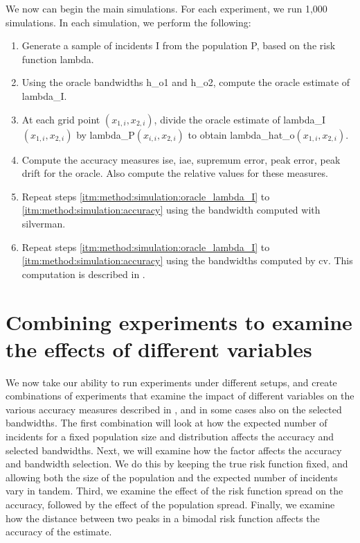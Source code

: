 We now can begin the main simulations.
For each experiment, we run 1,000 simulations.
In each simulation, we perform the following:
\begin{enumerate}
    \item\label{itm:method:simulation:generate} Generate a sample of incidents \gls{I} from the population \gls{P}, based on the risk function \gls{lambda}.
    \item\label{itm:method:simulation:oracle_lambda_I} Using the \gls{oracle} bandwidths \gls{h_o1} and \gls{h_o2}, compute the \gls{oracle} estimate of \gls{lambda_I}.
    \item\label{itm:method:simulation:oracle_lambda_hat} At each grid point $(x_{1,i}, x_{2,i})$, divide the oracle estimate of \gls{lambda_I}$(x_{1,i}, x_{2,i})$ by \gls{lambda_P}$(x_{i,i}, x_{2,i})$ to obtain \gls{lambda_hat_o}$(x_{1,i}, x_{2,i})$.
    \item\label{itm:method:simulation:accuracy} Compute the accuracy measures \gls{ise}, \gls{iae}, \gls{supremum error}, \gls{peak error}, \gls{peak drift} for the \gls{oracle}.
    Also compute the relative values for these measures.
    \item\label{itm:method:simulation:silverman_lambda_I} Repeat steps \ref{itm:method:simulation:oracle_lambda_I} to \ref{itm:method:simulation:accuracy} using the bandwidth computed with \gls{silverman}.
    \item\label{itm:method:simulation:cv_lambda_I} Repeat steps \ref{itm:method:simulation:oracle_lambda_I} to \ref{itm:method:simulation:accuracy} using the bandwidths computed by \gls{cv}.
    This computation is described in .
\end{enumerate}

\section{Combining experiments to examine the effects of different variables}
\label{sec:method:combining_experiments}

We now take our ability to run experiments under different setups,
and create combinations of experiments that examine the impact of different variables on the various accuracy measures described in ,
and in some cases also on the selected bandwidths.
The first combination will look at how the expected number of incidents for a fixed population size and distribution affects the accuracy and selected bandwidths.
Next, we will examine how the \gls{factor} affects the accuracy and bandwidth selection.
We do this by keeping the true risk function fixed, and allowing both the size of the population and the expected number of incidents vary in tandem.
Third, we examine the effect of the risk function spread on the accuracy,
followed by the effect of the population spread.
Finally,
we examine how the distance between two peaks in a bimodal risk function affects the accuracy of the estimate.

